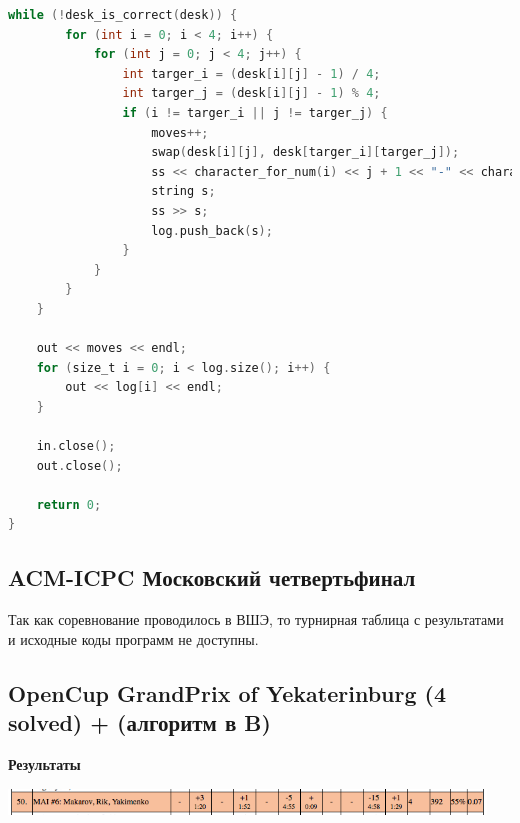 \documentclass[a4paper,12pt]{article}
\begin{document}
\begin{lstlisting}[language=C]
    while (!desk_is_correct(desk)) {
        for (int i = 0; i < 4; i++) {
            for (int j = 0; j < 4; j++) {
                int targer_i = (desk[i][j] - 1) / 4;
                int targer_j = (desk[i][j] - 1) % 4;
                if (i != targer_i || j != targer_j) {
                    moves++;
                    swap(desk[i][j], desk[targer_i][targer_j]);
                    ss << character_for_num(i) << j + 1 << "-" << character_for_num(targer_i) << targer_j + 1 << endl;
                    string s;
                    ss >> s;
                    log.push_back(s);
                }
            }
        }
    }
    
    out << moves << endl;
    for (size_t i = 0; i < log.size(); i++) {
        out << log[i] << endl;
    }
    
    in.close();
    out.close();
    
    return 0;
}

\end{lstlisting}





%
%
\newpage
\subsection{ACM-ICPC Московский четвертьфинал}

Так как соревнование проводилось в ВШЭ, то турнирная таблица с результатами и исходные коды программ не доступны. \\




%
%
\newpage
\subsection{OpenCup GrandPrix of Yekaterinburg (4 solved) + (алгоритм в B)}

\textbf{{\large Результаты}} \\
\begin{center}
\includegraphics[width=0.95\textwidth]{OC_YKB/result.png}\\ [1cm]
\end{center}
\end{document}
